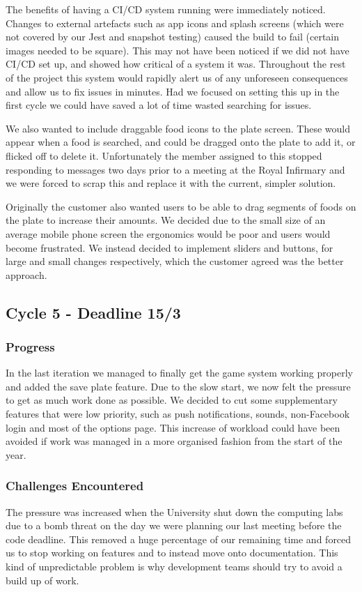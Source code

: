 \documentclass{l3proj}
\begin{document}
The benefits of having a CI/CD system running were immediately noticed. Changes to external artefacts such as app icons and splash screens (which were not covered by our Jest and snapshot testing) caused the build to fail (certain images needed to be square). This may not have been noticed if we did not have CI/CD set up, and showed how critical of a system it was. Throughout the rest of the project this system would rapidly alert us of any unforeseen consequences and allow us to fix issues in minutes. Had we focused on setting this up in the first cycle we could have saved a lot of time wasted searching for issues.

We also wanted to include draggable food icons to the plate screen. These would appear when a food is searched, and could be dragged onto the plate to add it, or flicked off to delete it. Unfortunately the member assigned to this stopped responding to messages two days prior to a meeting at the Royal Infirmary and we were forced to scrap this and replace it with the current, simpler solution.

Originally the customer also wanted users to be able to drag segments of foods on the plate to increase their amounts. We decided due to the small size of an average mobile phone screen the ergonomics would be poor and users would become frustrated. We instead decided to implement sliders and buttons, for large and small changes respectively, which the customer agreed was the better approach. 


\subsection{Cycle 5 - Deadline 15/3}
\subsubsection{Progress}
In the last iteration we managed to finally get the game system working properly and added the save plate feature. Due to the slow start, we now felt the pressure to get as much work done as possible. We decided to cut some supplementary features that were low priority, such as push notifications, sounds, non-Facebook login and most of the options page. This increase of workload could have been avoided if work was managed in a more organised fashion from the start of the year.

\subsubsection{Challenges Encountered}
The pressure was increased when the University shut down the computing labs due to a bomb threat on the day we were planning our last meeting before the code deadline. This removed a huge percentage of our remaining time and forced us to stop working on features and to instead move onto documentation. This kind of unpredictable problem is why development teams should try to avoid a build up of work.
\end{document}
